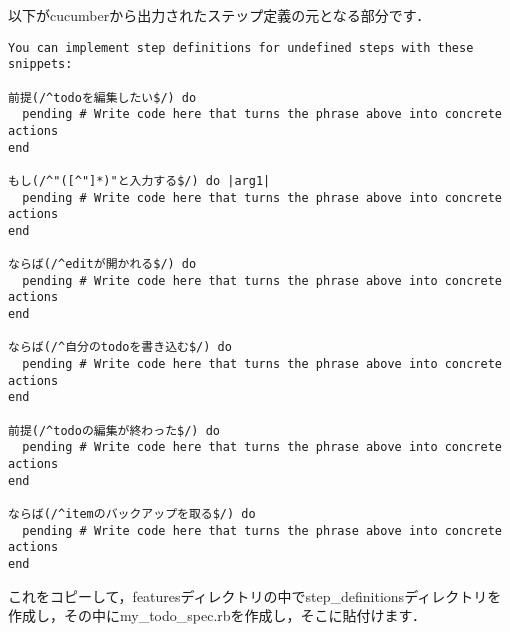 以下がcucumberから出力されたステップ定義の元となる部分です．
\begin{lstlisting}[style=customCsh]
You can implement step definitions for undefined steps with these snippets:

前提(/^todoを編集したい$/) do
  pending # Write code here that turns the phrase above into concrete actions
end

もし(/^"([^"]*)"と入力する$/) do |arg1|
  pending # Write code here that turns the phrase above into concrete actions
end

ならば(/^editが開かれる$/) do
  pending # Write code here that turns the phrase above into concrete actions
end

ならば(/^自分のtodoを書き込む$/) do
  pending # Write code here that turns the phrase above into concrete actions
end

前提(/^todoの編集が終わった$/) do
  pending # Write code here that turns the phrase above into concrete actions
end

ならば(/^itemのバックアップを取る$/) do
  pending # Write code here that turns the phrase above into concrete actions
end
\end{lstlisting}
これをコピーして，featuresディレクトリの中でstep\_definitionsディレクトリを作成し，その中にmy\_todo\_spec.rbを作成し，そこに貼付けます．

